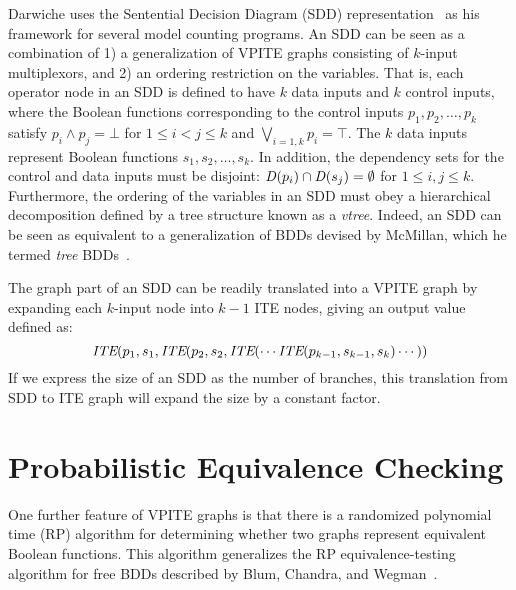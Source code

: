 \documentclass{llncs}
\newcommand{\tautology}{\top}
\newcommand{\nil}{\bot}
\newcommand{\ite}{\mbox{\it ITE}}
\newcommand{\depend}{{\it D}}
\begin{document}
Darwiche uses the Sentential Decision Diagram (SDD)
representation~\cite{darwiche:ijcai:2011} as his framework for several
model counting programs.  An SDD can be seen as a combination of 1) a
generalization of VPITE graphs consisting of $k$-input multiplexors,
and 2) an ordering restriction on the variables.
That is, each operator node in an SDD is defined to
have $k$ data inputs and $k$ control inputs, where the Boolean
functions corresponding to the control inputs $p_1, p_2, \ldots, p_k$
satisfy $p_i \land p_j = \nil$ for $1 \leq i < j \leq k$ and
$\bigvee_{i=1,k} p_i = \tautology$.  The $k$ data inputs represent
Boolean functions $s_1, s_2, \ldots, s_k$.  In addition, the
dependency sets for the control and data inputs must be disjoint:
$\depend(p_i) \cap \depend(s_j) = \emptyset$ for $1 \leq i,j \leq k$.
Furthermore, the ordering of the variables in an SDD must obey a hierarchical decomposition
defined by
a tree structure known as a {\em vtree}.  Indeed, an SDD can be seen
as equivalent to a generalization of BDDs devised by McMillan, which
he termed {\em tree} BDDs~\cite{mcmillan:cav:1994}.

The graph part of an SDD can be readily translated into a VPITE graph
by expanding each $k$-input node into $k-1$ ITE nodes, giving an
output value defined as:
\begin{displaymath}
\ite(p_1, s_1, \ite(p_2, s_2, \ite( \cdots \ite(p_{k-1}, s_{k-1}, s_k)\cdots))
\end{displaymath}
If we express the size of an SDD as the number of branches, this
translation from SDD to ITE graph will expand the size by a constant
factor.


\section{Probabilistic Equivalence Checking}

One further feature of VPITE graphs is that there is a randomized
polynomial time (RP) algorithm for determining whether two graphs
represent equivalent Boolean functions.  This algorithm generalizes
the RP equivalence-testing algorithm for free BDDs described by Blum,
Chandra, and Wegman~\cite{blum:ipl:1980}.


\end{document}
